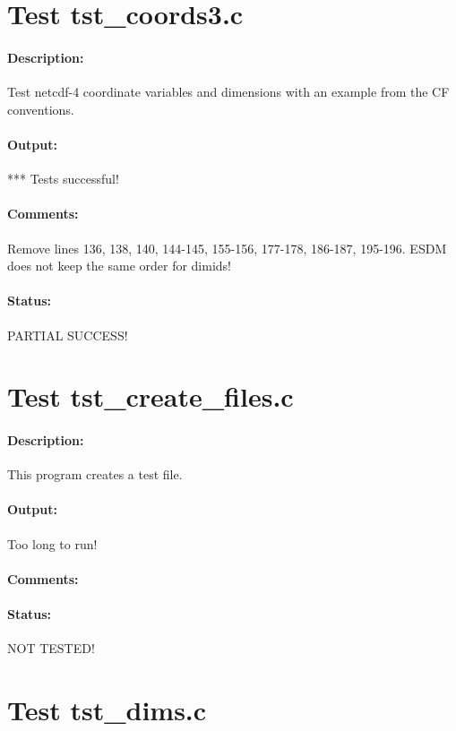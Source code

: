 \section{Test tst\_coords3.c}

\paragraph{Description:} Test netcdf-4 coordinate variables and dimensions with an example from the CF conventions.

\paragraph{Output:} *** Tests successful!

\paragraph{Comments:} Remove lines 136, 138, 140, 144-145, 155-156, 177-178, 186-187, 195-196. ESDM does not keep the same order for dimids!

\paragraph{Status:} PARTIAL SUCCESS!

\section{Test tst\_create\_files.c}

\paragraph{Description:} This program creates a test file.

\paragraph{Output:} Too long to run!

\paragraph{Comments:}

\paragraph{Status:} NOT TESTED!

\section{Test tst\_dims.c}

